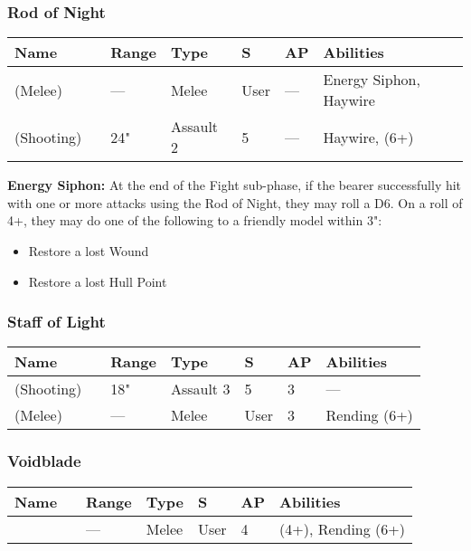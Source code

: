 \subsubsection{Rod of Night} \label{Rod of Night}
\noindent
\begin{tabular}{||m{110pt} m{30pt} m{31pt} m{55pt} m{12pt} m{12pt} m{210pt}||}
	\hline
	Name & & Range & Type & S & AP & Abilities \\
	\hline
	\quickref{Rod of Night} (Melee) & & — & Melee & User & — & Energy Siphon, Haywire \\
	\quickref{Rod of Night} (Shooting) & & 24" & Assault 2 & 5 & — & Haywire, \quickref{Tesla} (6+) \\
	\hline
\end{tabular}
\label{Energy Siphon}
\textbf{Energy Siphon:} At the end of the Fight sub-phase, if the bearer successfully hit with one or more attacks using the Rod of Night, they may roll a D6. On a roll of 4+, they may do one of the following to a friendly model within 3":
\begin{itemize}
	\item Restore a lost Wound
	\item Restore a lost Hull Point
\end{itemize}
	

\subsubsection{Staff of Light} \label{Staff of Light}
\noindent
\begin{tabular}{||m{110pt} m{30pt} m{31pt} m{55pt} m{12pt} m{12pt} m{210pt}||}
	\hline
	Name & & Range & Type & S & AP & Abilities \\
	\hline
	\quickref{Staff of Light} (Shooting) & & 18" & Assault 3 & 5 & 3 & — \\
	\quickref{Staff of Light} (Melee) & & — & Melee & User & 3 & Rending (6+) \\
	\hline
\end{tabular}

\subsubsection{Voidblade} \label{Voidblade}
\noindent
\begin{tabular}{||m{110pt} m{30pt} m{31pt} m{55pt} m{12pt} m{12pt} m{210pt}||}
	\hline
	Name & & Range & Type & S & AP & Abilities \\
	\hline
	\quickref{Voidblade} &  & — & Melee & User & 4 & \quickref{Entropic Strike} (4+), Rending (6+) \\
	\hline
\end{tabular}

